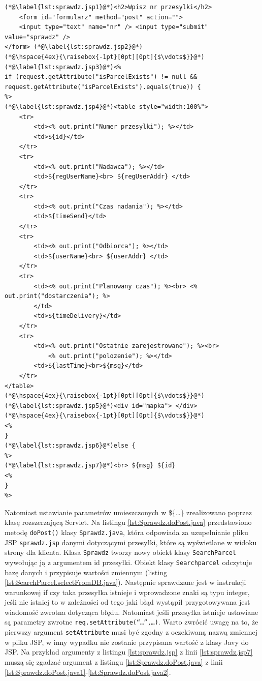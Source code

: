 \documentclass[eng,printmode,oneside]{mgr}
\begin{document}
\begin{lstlisting}[caption=Ciało pliku JavaServlet Pages -
sprawdz.jsp,label=lst:Sprawdz.jsp] 
(*@\label{lst:sprawdz.jsp1}@*)<h2>Wpisz nr przesylki</h2> 
	<form id="formularz" method="post" action=""> 
	<input type="text" name="nr" /> <input type="submit" value="sprawdz" />
</form> (*@\label{lst:sprawdz.jsp2}@*)
(*@\hspace{4ex}{\raisebox{-1pt}[0pt][0pt]{$\vdots$}}@*)
(*@\label{lst:sprawdz.jsp3}@*)<%
if (request.getAttribute("isParcelExists") != null &&
request.getAttribute("isParcelExists").equals(true)) {
%>
(*@\label{lst:sprawdz.jsp4}@*)<table style="width:100%">
	<tr>
		<td><% out.print("Numer przesylki"); %></td>
		<td>${id}</td>
	</tr>
	<tr>
		<td><% out.print("Nadawca"); %></td>
		<td>${regUserName}<br> ${regUserAddr} </td>
	</tr>
	<tr>
		<td><% out.print("Czas nadania"); %></td>
		<td>${timeSend}</td>
	</tr>
	<tr>
		<td><% out.print("Odbiorca"); %></td>
		<td>${userName}<br> ${userAddr} </td>
	</tr>
	<tr>
		<td><% out.print("Planowany czas"); %><br> <% out.print("dostarczenia"); %>
		</td>
		<td>${timeDelivery}</td>
	</tr>
	<tr>
		<td><% out.print("Ostatnie zarejestrowane"); %><br>
			<% out.print("polozenie"); %></td>
		<td>${lastTime}<br>${msg}</td>
	</tr>
</table>
(*@\hspace{4ex}{\raisebox{-1pt}[0pt][0pt]{$\vdots$}}@*)
(*@\label{lst:sprawdz.jsp5}@*)<div id="mapka"> </div>
(*@\hspace{4ex}{\raisebox{-1pt}[0pt][0pt]{$\vdots$}}@*)
<%
}
(*@\label{lst:sprawdz.jsp6}@*)else {
%>
(*@\label{lst:sprawdz.jsp7}@*)<br> ${msg} ${id}
<% 
}
%>
\end{lstlisting}

Natomiast ustawianie parametrów umieszczonych w \$\{\ldots\} zrealizowano
poprzez klasę rozszerzającą Servlet. Na listingu \ref{lst:Sprawdz.doPost.java}
przedstawiono metodę \texttt{doPost()} klasy \texttt{Sprawdz.java}, która odpowiada za uzupełnianie
pliku JSP \texttt{sprawdz.jsp} danymi dotyczącymi przesyłki, które są
wyświetlane w widoku strony dla klienta. Klasa \texttt{Sprawdz} tworzy nowy
obiekt klasy \texttt{SearchParcel} wywołując ją z argumentem id przesyłki.
Obiekt klasy \texttt{Searchparcel} odczytuje bazę danych i przypisuje
wartości zmiennym (listing \ref{lst:SearchParcel.selectFromDB.java}). Następnie sprawdzane
jest w instrukcji warunkowej if czy taka przesyłka istnieje i wprowadzone znaki są
typu integer, jeśli nie istniej to w zależności od tego jaki błąd wystąpił
przygotowywana jest wiadomość zwrotna dotycząca błędu. Natomiast jeśli przesyłka
istnieje ustawiane są parametry zwrotne
\texttt{req.setAttribute(``\ldots'',\ldots)}. Warto zwrócić uwagę na to, że
pierwszy argument \texttt{setAttribute} musi być zgodny z oczekiwaną nazwą
zmiennej w pliku JSP, w inny wypadku nie zostanie przypisana wartość z klasy
Javy do JSP. Na przykład argumenty z listingu \ref{lst:sprawdz.jsp} z linii
\ref{lst:sprawdz.jsp7} muszą się zgadzać argument z listingu
\ref{lst:Sprawdz.doPost.java} z linii \ref{lst:Sprawdz.doPost.java1}-\ref{lst:Sprawdz.doPost.java2}.
\end{document}
